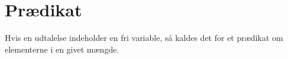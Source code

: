 \chapter{Prædikat}
\begin{defn}
         Hvis en udtalelse indeholder en fri variable, så kaldes det for et prædikat om elementerne i en givet mængde. 
\end{defn}
